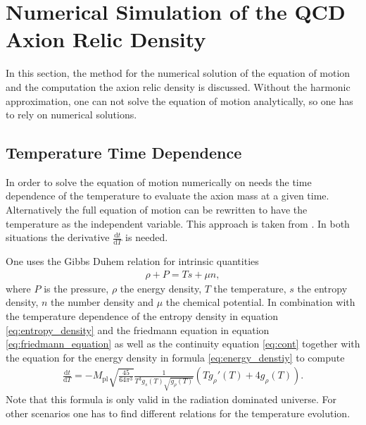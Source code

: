 \documentclass[a4paper, 12pt]{article}
\newcommand{\diff}{\mathrm{d}}
\begin{document}
\section{Numerical Simulation of the QCD Axion Relic Density}
In this section, the method for the numerical solution of the equation of motion and the
computation the axion relic density is discussed.
Without the harmonic approximation, one can not solve the equation of motion
analytically, so one has to rely on numerical solutions.

\subsection{Temperature Time Dependence}
In order to solve the equation of motion numerically
on needs the time dependence of the temperature
to evaluate the axion mass at a given time.
Alternatively the full equation of motion can be rewritten
to have the temperature as the independent variable.
This approach is taken from \cite[S11]{LatticQCD4Cosmo}.
In both situations the derivative $\frac{\diff t}{\diff T}$
is needed.

\noindent
One uses the Gibbs Duhem relation for intrinsic quantities
\begin{align}
    \label{eq:gibbs_duhem}
    \rho + P = T s + \mu n,
\end{align}
where $P$ is the pressure, $\rho$ the energy density, $T$ the temperature, $s$ the entropy density,
$n$ the number density and $\mu$ the chemical potential.
In combination with the temperature dependence of the entropy density in equation
\ref{eq:entropy_density}
and the friedmann equation
in equation \ref{eq:friedmann_equation} as well as the continuity equation \ref{eq:cont}
together with the equation for
the energy density in formula \ref{eq:energy_denstiy}
to compute
\begin{align}
    \label{eq:dtdT}
    \frac{\diff t}{\diff T} = - M_\mathrm{pl} \sqrt{\frac{45}{64 \pi^3}} \frac{1}{T^3 g_s(T) \sqrt{g_\rho(T)}} (T g_\rho'(T) + 4 g_\rho(T)).
\end{align}
Note that this formula is only valid in the radiation dominated universe.
For other scenarios one has to find different relations for the temperature evolution.
\end{document}
